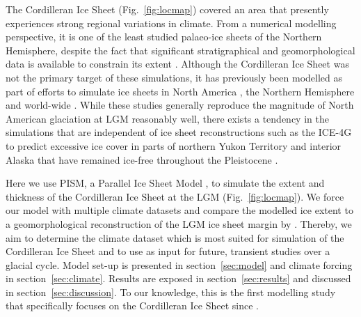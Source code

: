 The Cordilleran Ice Sheet (Fig.~\ref{fig:locmap}) covered an area that presently experiences strong regional variations in climate. From a numerical modelling perspective, it is one of the least studied palaeo-ice sheets of the Northern Hemisphere, despite the fact that significant stratigraphical and geomorphological data is available to constrain its extent \citep{jackson-clague-1991,dukrodkin-1999,kaufman-manley-2004,kleman-etal-2010,margold-etal-2011}. Although the Cordilleran Ice Sheet was not the primary target of these simulations, it has previously been modelled as part of efforts to simulate ice sheets in North America \citep{marshall-clarke-1999,calov-etal-2002,tarasov-peltier-1997,tarasov-peltier-2004,gregoire-etal-2012}, the Northern Hemisphere \citep{huybrechts-tsiobbel-1996,greve-etal-1999,charbit-etal-2002,charbit-etal-2007,charbit-etal-2013,johnson-fastook-2002,rodgers-etal-2004,bintanja-etal-2005,zweck-huybrechts-2005,abeouchi-etal-2007} and world-wide \citep{yoshimori-etal-2001}. While these studies generally reproduce the magnitude of North American glaciation at LGM reasonably well, there exists a tendency in the simulations that are independent of ice sheet reconstructions such as the ICE-4G to predict excessive ice cover in parts of northern Yukon Territory and interior Alaska that have remained ice-free throughout the Pleistocene \citep{dukrodkin-1999,kaufman-manley-2004}.

Here we use PISM, a Parallel Ice Sheet Model \citep{web:pism}, to simulate the extent and thickness of the Cordilleran Ice Sheet at the LGM (Fig.~\ref{fig:locmap}). We force our model with multiple climate datasets and compare the modelled ice extent to a geomorphological reconstruction of the LGM ice sheet margin by \citet{dyke-2004}. Thereby, we aim to determine the climate dataset which is most suited for simulation of the Cordilleran Ice Sheet and to use as input for future, transient studies over a glacial cycle. Model set-up is presented in section~\ref{sec:model} and climate forcing in section~\ref{sec:climate}. Results are exposed in section~\ref{sec:results} and discussed in section~\ref{sec:discussion}. To our knowledge, this is the first modelling study that specifically focuses on the Cordilleran Ice Sheet since \citet{robert-1991}.
